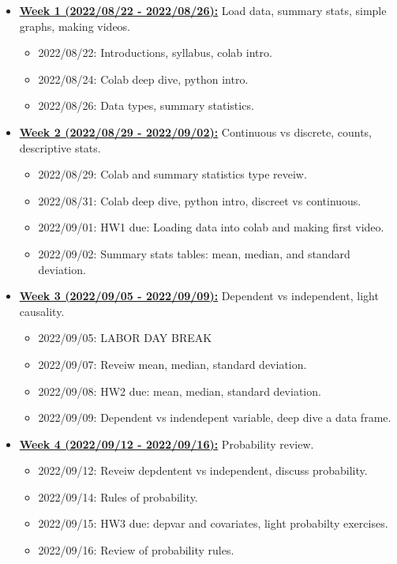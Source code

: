\documentclass[11pt]{article}
\begin{document}
\begin{itemize}
  \item \underline{\textbf{Week 1 (2022/08/22 - 2022/08/26):}} Load data, summary stats, simple graphs, making videos.
  \begin{itemize}
    \item 2022/08/22: Introductions, syllabus, colab intro.
    \item 2022/08/24: Colab deep dive, python intro.
    \item 2022/08/26: Data types, summary statistics.
  \end{itemize}
  
  \item \underline{\textbf{Week 2 (2022/08/29 - 2022/09/02):}} Continuous vs discrete, counts, descriptive stats.
  \begin{itemize}
    \item 2022/08/29: Colab and summary statistics type reveiw. 
    \item 2022/08/31: Colab deep dive, python intro, discreet vs continuous.
    \item 2022/09/01: HW1 due: Loading data into colab and making first video.
    \item 2022/09/02: Summary stats tables: mean, median, and standard deviation. 
  \end{itemize}

  \item \underline{\textbf{Week 3 (2022/09/05 - 2022/09/09):}} Dependent vs independent, light causality. 
  \begin{itemize}
    \item 2022/09/05: LABOR DAY BREAK
    \item 2022/09/07: Reveiw mean, median, standard deviation. 
    \item 2022/09/08: HW2 due: mean, median, standard deviation.
    \item 2022/09/09: Dependent vs indendepent variable, deep dive a data frame. 
  \end{itemize}


  \item \underline{\textbf{Week 4 (2022/09/12 - 2022/09/16):}} Probability review. 
  \begin{itemize}
    \item 2022/09/12: Reveiw depdentent vs independent, discuss probability. 
    \item 2022/09/14: Rules of probability. 
    \item 2022/09/15: HW3 due: depvar and covariates, light probabilty exercises.
    \item 2022/09/16: Review  of probability rules. 
  \end{itemize}


\end{itemize}
\end{document}
